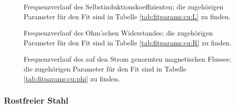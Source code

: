 \clearpage
\begin{figure}[h!]
    \resizebox{\textwidth}{!}{}
    \caption{
        Frequenzverlauf  des Selbstinduktionskoeffizienten;  die zugeh\"origen
        Parameter f\"ur  den Fit  sind in Tabelle  \ref{tab:fitparams:cu:L} zu
        finden.
    }
    \label{fig:cu:freq:L}
\end{figure}
\begin{figure}[h!]
    \resizebox{\textwidth}{!}{}
    \caption{
        Frequenzverlauf   des   Ohm'schen  Widerstandes;   die   zugeh\"origen
        Parameter f\"ur  den Fit  sind in Tabelle  \ref{tab:fitparams:cu:R} zu
        finden.
    }
    \label{fig:cu:freq:R}
\end{figure}

\begin{minipage}[t][][t]{0.48\textwidth}
    
\end{minipage}
\begin{minipage}[t][][t]{0.48\textwidth}
    
\end{minipage}

\clearpage
\begin{figure}[h!]
    \resizebox{\textwidth}{!}{}
    \caption{
        Frequenzverlauf  des auf  den  Strom  genormten magnetischen  Flusses;
        die   zugeh\"origen  Parameter   f\"ur   den  Fit   sind  in   Tabelle
        \ref{tab:fitparams:cu:phi} zu finden.
    }
    \label{fig:cu:freq:phi}
\end{figure}




\clearpage
\subsubsection{Rostfreier Stahl}
\label{sec:ausw:subsec:hohlz:subsubsec:steel}

